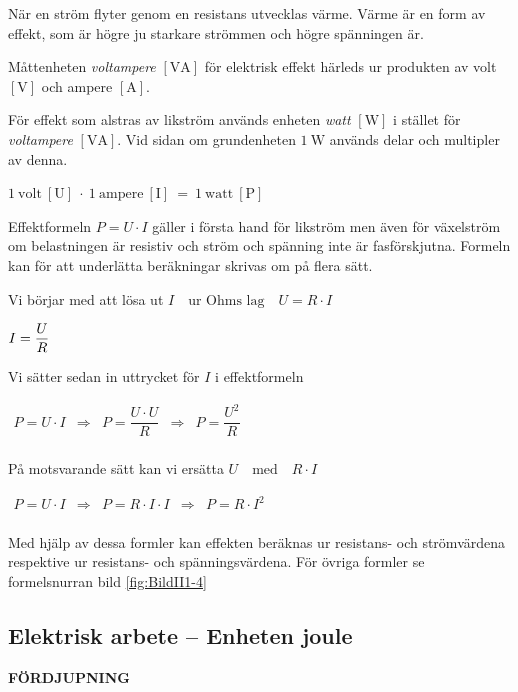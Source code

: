När en ström flyter genom en resistans utvecklas värme.
Värme är en form av effekt, som är högre ju starkare strömmen och högre
spänningen är.

Måttenheten \emph{voltampere} \(\mathrm{[VA]}\) för elektrisk effekt härleds ur
produkten av volt \(\mathrm{[V]}\) och ampere \(\mathrm{[A]}\).

För effekt som alstras av likström används enheten \emph{watt} \(\mathrm{[W]}\)
\cite{SIbrochure8} i stället för \emph{voltampere} \(\mathrm{[VA]}\).
Vid sidan om grundenheten \(1\ \mathrm{W}\) används delar och multipler av
denna.

\(1\ \mathrm{volt\ [U]}\ \cdot\ 1\ \mathrm{ampere\ [I]}\ =\ 1\ \mathrm{watt\ [P]}\)

Effektformeln \(P = U \cdot I\) gäller i första hand för likström men även för
växelström om belastningen är resistiv och ström och spänning inte är
fasförskjutna.
Formeln kan för att underlätta beräkningar skrivas om på flera sätt.

Vi börjar med att lösa ut \(I \quad \text{ur Ohms lag} \quad U = R \cdot I\) 

\(
I = \dfrac{U}{R}\\
\)

Vi sätter sedan in uttrycket för \(I\) i effektformeln

\(
\begin{array}{lllll}
P=U \cdot I & \Rightarrow & P= \dfrac{U \cdot U}{R} & \Rightarrow & P= \dfrac{U^2}{R}\\
\end{array}
\)

På motsvarande sätt kan vi ersätta \(U \quad\text{med}\quad R \cdot I\)

\(
\begin{array}{lllll}
P=U \cdot I & \Rightarrow & P = R \cdot I \cdot I  & \Rightarrow & P = R \cdot I^2\\
\end{array}
\)

Med hjälp av dessa formler kan effekten beräknas ur resistans- och strömvärdena
respektive ur resistans- och spänningsvärdena.
För övriga formler se formelsnurran bild \ref{fig:BildII1-4}

\subsection{Elektrisk arbete -- Enheten joule}
\textbf{FÖRDJUPNING}

